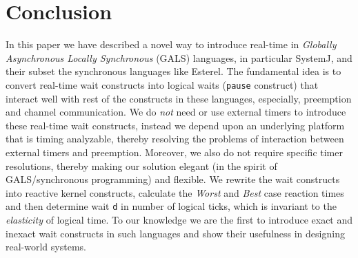 \section{Conclusion}
\label{sec:concl-future-work}

In this paper we have described a novel way to introduce real-time in
\textit{Globally Asynchronous Locally Synchronous} (GALS) languages, in
particular SystemJ, and their subset the synchronous languages like
Esterel. The fundamental idea is to convert real-time wait constructs
into logical waits (\texttt{pause} construct) that interact well with
rest of the constructs in these languages, especially, preemption and
channel communication. We do \textit{not} need or use external timers to
introduce these real-time wait constructs, instead we depend upon an
underlying platform that is timing analyzable, thereby resolving the
problems of interaction between external timers and
preemption. Moreover, we also do not require specific timer resolutions,
thereby making our solution elegant (in the spirit of GALS/synchronous
programming) and flexible. We rewrite the wait constructs into reactive
kernel constructs, calculate the \textit{Worst} and \textit{Best} case
reaction times and then determine wait \texttt{d} in number of logical
ticks, which is invariant to the \textit{elasticity} of logical time. To
our knowledge we are the first to introduce exact and inexact wait
constructs in such languages and show their usefulness in designing
real-world systems.



